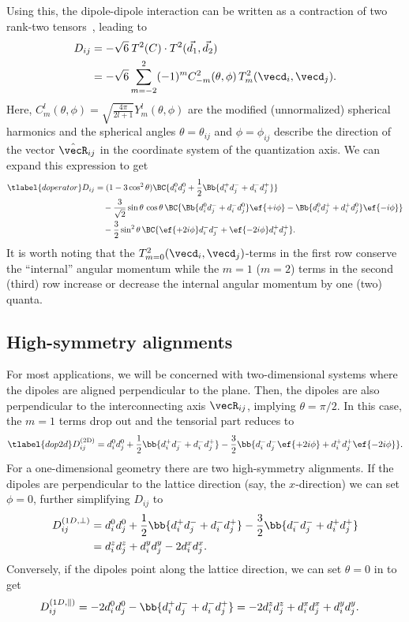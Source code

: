 Using this, the dipole-dipole interaction can be written as a contraction of two rank-two tensors~\cite{Brown2003}, leading to
\begin{align}
    D_{ij} &= -\sqrt{6} \: T^2(C)\cdot T^2(\vec{d_1},\vec{d_2})\\
           &= -\sqrt{6}  \sum_{m=-2}^{2} (-1)^m C^2_{-m}(\theta,\phi) \, T^2_m(\vecd_i,\vecd_j).
\end{align}
Here, $C^l_m(\theta,\phi)=\sqrt{\frac{4\pi}{2l+1}} Y^l_m(\theta,\phi)$ are the modified (unnormalized) spherical harmonics and the spherical angles $\theta = \theta_{ij}$ and $\phi = \phi_{ij}$ describe the direction of the vector $\hat{\vecR}_{ij}$ in the coordinate system of the quantization axis. We can expand this expression to get
\begin{align}\tlabel{doperator}
    D_{ij} &= (1-3\cos^2 \theta) \BC{ d_i^0 d_j^0 + \frac{1}{2}\Bb{d_i^+ d_j^- + d_i^- d_j^+} } \\
           &\quad -\frac{3}{\sqrt{2}}\sin\theta \,\cos\theta\, \BC{ \Bb{ d_i^0 d_j^- + d_i^- d_j^0 } \ef{+i\phi} - \Bb{ d_i^0 d_j^+ + d_i^+ d_j^0 } \ef{-i\phi} } \\
           &\quad -\frac{3}{2}\sin^2\theta \, \BC{ \ef{+2i\phi} d_i^- d_j^- + \ef{-2i\phi} d_i^+ d_j^+ }.
\end{align}
It is worth noting that the $T^2_{m=0}(\vecd_i, \vecd_j)$-terms in the first row conserve the ``internal'' angular momentum while the $m=1$ ($m=2$) terms in the second (third) row increase or decrease the internal angular momentum by one (two) quanta.

\subsection{High-symmetry alignments}
For most applications, we will be concerned with two-dimensional systems where the dipoles are aligned perpendicular to the plane. Then, the dipoles are also perpendicular to the interconnecting axis $\vecR_{ij}$, implying $\theta = \pi/2$. In this case, the $m=1$ terms drop out and the tensorial part reduces to
\begin{align} \tlabel{dop2d}
    D^\text{(2D)}_{ij} = d_i^0 d_j^0 + \frac{1}{2}\bb{d_i^+ d_j^- + d_i^- d_j^+} -\frac{3}{2} \bb{ d_i^- d_j^- \ef{+2i\phi} + d_i^+ d_j^+ \ef{-2i\phi} }.
\end{align}
For a one-dimensional geometry there are two high-symmetry alignments. If the dipoles are perpendicular to the lattice direction (say, the $x$-direction) we can set $\phi=0$, further simplifying $D_{ij}$ to
\begin{align}
    D_{ij}^{(1D,\perp)} &= d_i^0 d_j^0 + \frac{1}{2}\bb{d_i^+ d_j^- + d_i^- d_j^+} -\frac{3}{2} \bb{d_i^- d_j^- + d_i^+ d_j^+} \\
 &= d_i^z d_j^z + d_i^y d_j^y - 2 d_i^x d_j^x.
\end{align}
Conversely, if the dipoles point along the lattice direction, we can set $\theta=0$ in  to get
\begin{align}
    D^{(1D,\parallel)}_{ij} &= -2 d_i^0 d_j^0 - \bb{d_i^+ d_j^- + d_i^- d_j^+} = -2 d_i^z d_j^z+ d_i^x d_j^x + d_i^y d_j^y.
\end{align}

